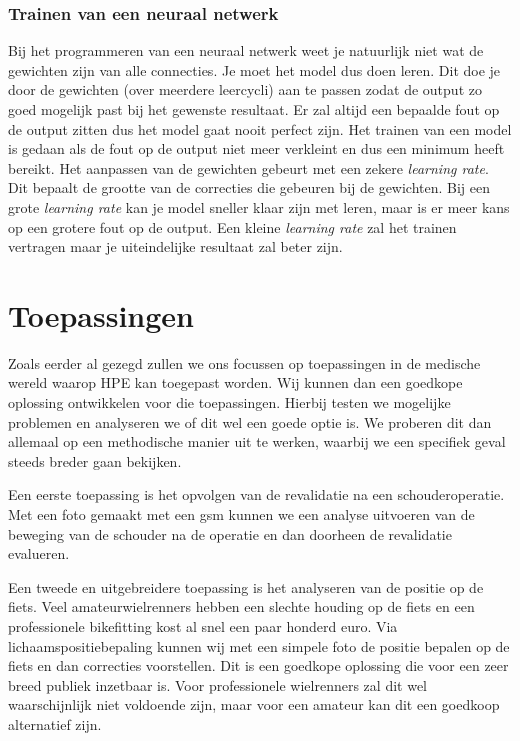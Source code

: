 \documentclass[a4paper,twoside,kulak]{kulakreport}
\begin{document}
\subsection{Trainen van een neuraal netwerk}
Bij het programmeren van een neuraal netwerk weet je natuurlijk niet wat de gewichten zijn van alle connecties. Je moet het model dus doen leren. Dit doe je door de gewichten (over meerdere leercycli) aan te passen zodat de output zo goed mogelijk past bij het gewenste resultaat. Er zal altijd een bepaalde fout op de output zitten dus het model gaat nooit perfect zijn. Het trainen van een model is gedaan als de fout op de output niet meer verkleint en dus een minimum heeft bereikt. Het aanpassen van de gewichten gebeurt met een zekere \emph{learning rate}. Dit bepaalt de grootte van de correcties die gebeuren bij de gewichten. Bij een grote \emph{learning rate} kan je model sneller klaar zijn met leren, maar is er meer kans op een grotere fout op de output. Een kleine \emph{learning rate} zal het trainen vertragen maar je uiteindelijke resultaat zal beter zijn.



\chapter{Toepassingen}
Zoals eerder al gezegd zullen we ons focussen op toepassingen in de medische wereld waarop HPE kan toegepast worden. Wij kunnen dan een goedkope oplossing ontwikkelen voor die toepassingen. Hierbij testen we mogelijke problemen en analyseren we of dit wel een goede optie is. We proberen dit dan allemaal op een methodische manier uit te werken, waarbij we een specifiek geval steeds breder gaan bekijken.


Een eerste toepassing is het opvolgen van de revalidatie na een schouderoperatie. Met een foto gemaakt met een gsm kunnen we een analyse uitvoeren van de beweging van de schouder na de operatie en dan doorheen de revalidatie evalueren.

Een tweede en uitgebreidere toepassing is het analyseren van de positie op de fiets. Veel amateurwielrenners hebben een slechte houding op de fiets en een professionele bikefitting kost al snel een paar honderd euro. Via lichaamspositiebepaling kunnen wij met een simpele foto de positie bepalen op de fiets en dan correcties voorstellen. Dit is een goedkope oplossing die voor een zeer breed publiek inzetbaar is. Voor professionele wielrenners zal dit wel waarschijnlijk niet voldoende zijn, maar voor een amateur kan dit een goedkoop alternatief zijn.
\end{document}
